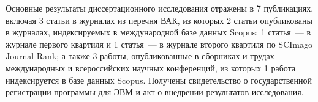 {%
    \nocite{vasilenko2024acm}
    \nocite{vasilenko2026plan_mapping}
    \nocite{vasilenko_article_inpress}
    \nocite{11289347}
    \nocite{vasilenko2025}
    \nocite{burl2025}
    \nocite{vasilenko_patent}
    {\publications} Основные результаты диссертационного исследования
    отражены в 7 публикациях, включая 3 статьи в журналах
    из перечня ВАК, из которых 2 статьи опубликованы в журналах,
    индексируемых в международной базе данных Scopus:
    1 статья~--- в журнале первого квартиля и
    1 статья~--- в журнале второго квартиля
    по SCImago Journal Rank; а также 3 работы, опубликованные
    в сборниках и трудах международных и всероссийских научных
    конференций, из которых 1 работа индексируется в базе данных
    Scopus. Получены свидетельство о государственной регистрации
    программы для ЭВМ и акт о внедрении результатов исследования.
}%
